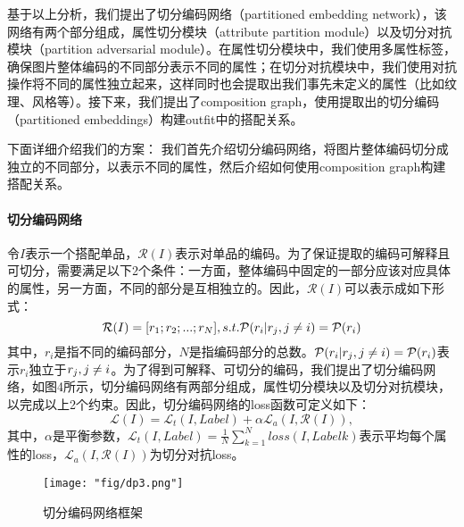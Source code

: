 \par 基于以上分析，我们提出了切分编码网络（partitioned embedding network），该网络有两个部分组成，属性切分模块（attribute partition module）以及切分对抗模块（partition adversarial module）。在属性切分模块中，我们使用多属性标签，确保图片整体编码的不同部分表示不同的属性；在切分对抗模块中，我们使用对抗操作将不同的属性独立起来，这样同时也会提取出我们事先未定义的属性（比如纹理、风格等）。接下来，我们提出了composition graph，使用提取出的切分编码（partitioned embeddings）构建outfit中的搭配关系。

\par 下面详细介绍我们的方案：
我们首先介绍切分编码网络，将图片整体编码切分成独立的不同部分，以表示不同的属性，然后介绍如何使用composition graph构建搭配关系。

\paragraph{切分编码网络}
令$I$表示一个搭配单品，$\mathcal{R}(I)$表示对单品的编码。为了保证提取的编码可解释且可切分，需要满足以下2个条件：一方面，整体编码中固定的一部分应该对应具体的属性，另一方面，不同的部分是互相独立的。因此，$\mathcal{R}(I)$可以表示成如下形式：
\begin{equation}
\mathcal{R}(I) = [r_{1};r_{2};...;r_{N}],\\
s.t. \mathcal{P}(r_{i}| \\{ r_{j},j \neq i \\}) = \mathcal{P}(r_{i})
\end{equation}
其中，$r_{i}$是指不同的编码部分，$N$是指编码部分的总数。$\mathcal{P}(r_{i}| \\{ r_{j},j \neq i \\}) = \mathcal{P}(r_{i})$表示$r_{i}$独立于$\\{ r_{j},j \neq i \\}$。为了得到可解释、可切分的编码，我们提出了切分编码网络，如图4所示，切分编码网络有两部分组成，属性切分模块以及切分对抗模块，以完成以上2个约束。因此，切分编码网络的loss函数可定义如下：
\begin{equation}
\mathcal{L}(I) = \mathcal{L}_{t}(I,Label) + \alpha \mathcal{L}_{a}(I,\mathcal{R}(I)),
\end{equation}
其中，$\alpha$是平衡参数，$\mathcal{L}_{t}(I,Label)=\frac{1}{N}\sum_{k=1}^{N}loss(I,Label k)$表示平均每个属性的loss，$\mathcal{L}_{a}(I,\mathcal{R}(I))$为切分对抗loss。
\begin{figure}[!h]
	\centering
	\texttt{[image: "fig/dp3.png"]}
	\caption{切分编码网络框架}
	\label{fig:dp3}
\end{figure}


